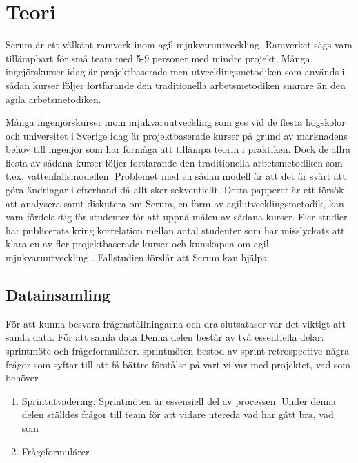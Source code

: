 \section{Teori}
\label{sec:Lieth_Wahid-theory}
Scrum är ett välkänt ramverk inom agil mjukvaruutveckling. Ramverket sägs vara tillämpbart för små team med 5-9 personer med mindre projekt.  Många ingejörskurser idag är projektbaserade men utvecklingsmetodiken som används i sådan kurser följer fortfarande den traditionella arbetsmetodiken snarare än den agila arbetsmetodiken.  

Många ingenjörskurser inom mjukvaruutveckling som ges vid de flesta högskolor och universitet i Sverige idag är projektbaserade kurser på grund av marknadens behov till ingenjör som har förmåga att tillämpa teorin i praktiken. Dock de allra flesta av sådana kurser följer fortfarande den traditionella arbetsmetodiken som t.ex. vattenfallsmodellen. Problemet med en sådan modell är att det är svårt att göra ändringar i efterhand då allt sker sekventiellt. Detta papperet är ett försök att analysera samt diskutera om Scrum, en form av agilutvecklingsmetodik, kan vara fördelaktig för studenter för att uppnå målen av sådana kurser.
Fler studier har publicerats kring korrelation mellan antal studenter som har misslyckats att klara en av fler projektbaserade kurser och kunskapen om agil mjukvaruutveckling \cite{Usingscr27:online}. Fallstudien förslår att Scrum kan hjälpa

\subsection{Datainsamling}
För att kunna besvara frågraställningarna och dra slutsataser var det viktigt att samla data. För att samla data 
Denna delen består av två essentiella delar: sprintmöte och frågeformulärer. sprintmöten bestod av sprint retrospective några frågor som syftar till att få bättre förstålse på vart vi var med projektet, vad som behöver 
\begin{enumerate}
	\item {Sprintutvädering}: Sprintmöten är essensiell del av processen. Under denna delen ställdes frågor till  team för att vidare utereda vad har gått bra, vad som 
	\item  {Frågeformulärer}
\end{enumerate}